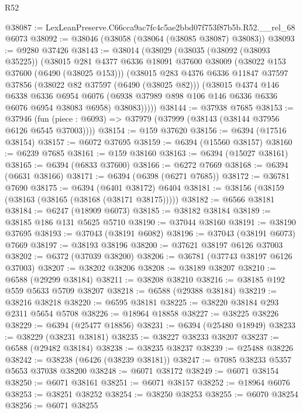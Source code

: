 \begin{lexlean}{R52}
\begin{coremodule}
@38087 := LexLeanPreserve.C66cca9ac7fc4c5ae2bbd07f753f87b5b.R52.__rel_68 @6073
@38092 := @38046 (@38058 (@38064 (@38085 @38087) @38083))
@38093 := @9280 @37426
@38143 := @38014
    (@38029
      (@38035
        (@38092 (@38093 @35225))
        (@38015
          @281
          @4377
          @6336
          @18091
          @37600
          @38009
          (@38022 @153 @37600 (@6490 (@38025 @153)))
          (@38015
            @283
            @4376
            @6336
            @11847
            @37597
            @37856
            (@38022 @82 @37597 (@6490 (@38025 @82)))
            (@38015
              @4374
              @146
              @6338
              @6336
              @6954
              @6076
              (@6938 @37989 @898 @106 @146 @6336 @6336 @6076 @6954 @38083 @6958)
              @38083)))))
@38144 := @37938 @7685
@38153 := @37946
    (fun (piece : @6093) => @37979 (@37999 (@38143 (@38144 @37956 @6126 @6545 @37003))))
@38154 := @159 @37620
@38156 := @6394 (@17516 @38154)
@38157 := @6072 @37695
@38159 := @6394 (@15560 @38157)
@38160 := @6239 @7685
@38161 := @159 @38160
@38163 := @6394 (@15027 @38161)
@38165 := @6394 (@6833 @37600)
@38166 := @6272 @7669
@38168 := @6394 (@6631 @38166)
@38171 := @6394 (@6398 (@6271 @7685))
@38172 := @36781 @7690
@38175 := @6394 (@6401 @38172) @6404
@38181 := @38156 (@38159 (@38163 (@38165 (@38168 (@38171 @38175)))))
@38182 := @6566 @38181
@38184 := @6247 (@18909 @6073)
@38185 := @38182 @38184
@38189 := @38185 @186 @131 @5625 @5710
@38190 := @37044 @38160
@38191 := @38190 @37695
@38193 := @37043 (@38191 @6082)
@38196 := @37043 (@38191 @6073) @7669
@38197 := @38193 @38196
@38200 := @37621 @38197 @6126 @37003
@38202 := @6372 (@37039 @38200)
@38206 := @36781 (@37743 @38197 @6126 @37003)
@38207 := @38202 @38206
@38208 := @38189 @38207
@38210 := @6588 (@29299 @38184)
@38211 := @38208 @38210
@38216 := @38185 @192 @559 @5633 @5709 @38207
@38218 := @6588 (@29388 @38184)
@38219 := @38216 @38218
@38220 := @6595 @38181
@38225 := @38220 @38184 @293 @2311 @5654 @5708
@38226 := @18964 @18858
@38227 := @38225 @38226
@38229 := @6394 (@25477 @18856)
@38231 := @6394 (@25480 @18949)
@38233 := @38229 (@38231 @38181)
@38235 := @38227 @38233 @38207
@38237 := @6588 (@29482 @38184)
@38238 := @38235 @38237
@38239 := @25488 @38226
@38242 := @38238 (@6426 (@38239 @38181))
@38247 := @7085 @38233 @5357 @5653 @37038 @38200
@38248 := @6071 @38172
@38249 := @6071 @38154
@38250 := @6071 @38161
@38251 := @6071 @38157
@38252 := @18964 @6076
@38253 := @38251 @38252
@38254 := @38250 @38253
@38255 := @6070 @38254
@38256 := @6071 @38255

\end{coremodule}
\end{lexlean}
